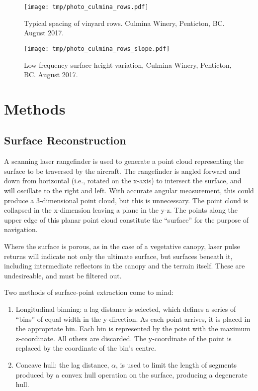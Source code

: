 \documentclass[doc]{apa6}
\begin{document}
\begin{figure} %
\texttt{[image: tmp/photo\_culmina\_rows.pdf]} 
\caption{Typical spacing of vinyard rows. Culmina Winery, Penticton, BC. August 2017.}
\label{fig:photo_culmina_rows}
\end{figure}

\begin{figure} %
\texttt{[image: tmp/photo\_culmina\_rows\_slope.pdf]} 
\caption{Low-frequency surface height variation, Culmina Winery, Penticton, BC. August 2017.}
\label{fig:photo_culmina_rows_slope}
\end{figure}


\section{Methods}

\subsection{Surface Reconstruction}

A scanning laser rangefinder is used to generate a point cloud representing the surface to be traversed by the aircraft. The rangefinder is angled forward and down from horizontal (i.e., rotated on the x-axis) to intersect the surface, and will oscillate to the right and left. With accurate angular measurement, this could produce a 3-dimensional point cloud, but this is unnecessary. The point cloud is collapsed in the x-dimension leaving a plane in the y-z. The points along the upper edge of this planar point cloud constitute the ``surface'' for the purpose of navigation.

Where the surface is porous, as in the case of a vegetative canopy, laser pulse returns will indicate not only the ultimate surface, but surfaces beneath it, including intermediate reflectors in the canopy and the terrain itself. These are undesireable, and must be filtered out. 

Two methods of surface-point extraction come to mind: 

\begin{enumerate}
\item Longitudinal binning: a lag distance is selected, which defines a series of ``bins'' of equal width in the y-direction. As each point arrives, it is placed in the appropriate bin. Each bin is represented by the point with the maximum z-coordinate. All others are discarded. The y-coordinate of the point is replaced by the coordinate of the bin's centre.
\item Concave hull: the lag distance, $\alpha$, is used to limit the length of segments produced by a convex hull operation on the surface, producing a degenerate hull.
\end{enumerate}
\end{document}
